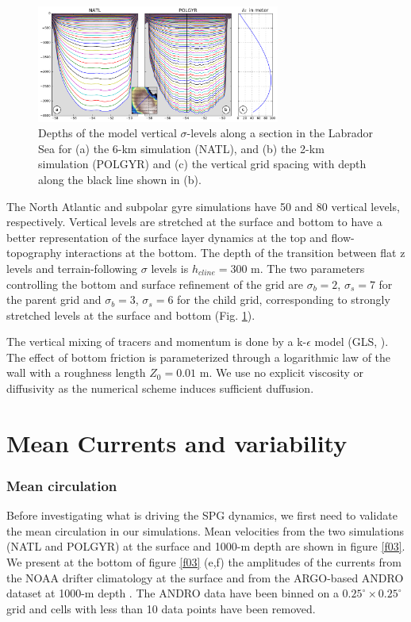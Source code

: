 \documentclass[os, manuscript]{copernicus}
\begin{document}
\begin{figure}[t]
\includegraphics[width=8cm]{../fig_os/f02.pdf}
\caption{Depths of the model vertical $\sigma$-levels along a section in the Labrador Sea for (a) the 6-km simulation (NATL), and (b) the 2-km simulation (POLGYR) and (c) the vertical grid spacing with depth along the black line shown in (b). }
\label{f02}
\end{figure} 


The North Atlantic and subpolar gyre simulations have 50 and 80 vertical levels, respectively. Vertical levels are stretched at the surface and bottom \citep{lemarie2012} to have a better representation of the surface layer dynamics at the top and flow-topography interactions at the bottom. The depth of the transition between flat z levels and terrain-following $\sigma$ levels is $h_{cline} = 300$ m. The two parameters controlling the bottom and surface refinement of the grid are $\sigma _b=2$, $\sigma _s=7$ for the parent grid and $\sigma _b=3$, $\sigma _s=6$ for the child grid, corresponding to strongly stretched levels at the surface and bottom (Fig. \ref{f02}).

The vertical mixing of tracers and momentum is done by a k-$\epsilon$ model (GLS, \citet{umlauf2003}). The effect of bottom friction is parameterized through a logarithmic law of the wall with a roughness length $Z_{0} = 0.01$ m. We use no explicit viscosity or diffusivity as the numerical scheme induces sufficient duffusion. 


\section{Mean Currents and variability}
\subsubsection{Mean circulation}
Before investigating what is driving the SPG dynamics, we first need to validate the mean circulation in our simulations. Mean velocities from the two simulations (NATL and POLGYR) at the surface and 1000-m depth are shown in figure \ref{f03}. We present at the bottom of figure \ref{f03} (e,f) the amplitudes of the currents from the NOAA drifter climatology \citep{laurindo2017} at the surface and from the ARGO-based ANDRO dataset at 1000-m depth \citep{ollitrault2013,lebedev2007}. The ANDRO data have been binned on a $0.25^{\circ}\times 0.25^{\circ}$ grid and cells with less than 10 data points have been removed. 
\end{document}
